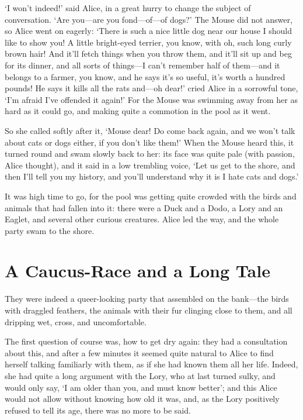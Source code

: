 \documentclass[12pt]{book}
\begin{document}
\begin{Parallel}[p]{}{}
{‘I won’t indeed!’ said Alice, in a great hurry to change the subject of conversation. ‘Are you—are you fond—of—of dogs?’ The Mouse did not answer, so Alice went on eagerly: ‘There is such a nice little dog near our house I should like to show you! A little bright-eyed terrier, you know, with oh, such long curly brown hair! And it’ll fetch things when you throw them, and it’ll sit up and beg for its dinner, and all sorts of things—I can’t remember half of them—and it belongs to a farmer, you know, and he says it’s so useful, it’s worth a hundred pounds! He says it kills all the rats and—oh dear!’ cried Alice in a sorrowful tone, ‘I’m afraid I’ve offended it again!’ For the Mouse was swimming away from her as hard as it could go, and making quite a commotion in the pool as it went.

So she called softly after it, ‘Mouse dear! Do come back again, and we won’t talk about cats or dogs either, if you don’t like them!’ When the Mouse heard this, it turned round and swam slowly back to her: its face was quite pale (with passion, Alice thought), and it said in a low trembling voice, ‘Let us get to the shore, and then I’ll tell you my history, and you’ll understand why it is I hate cats and dogs.’

It was high time to go, for the pool was getting quite crowded with the birds and animals that had fallen into it: there were a Duck and a Dodo, a Lory and an Eaglet, and several other curious creatures. Alice led the way, and the whole party swam to the shore.

\section{A Caucus-Race and a Long Tale}

They were indeed a queer-looking party that assembled on the bank—the birds with draggled feathers, the animals with their fur clinging close to them, and all dripping wet, cross, and uncomfortable.

The first question of course was, how to get dry again: they had a consultation about this, and after a few minutes it seemed quite natural to Alice to find herself talking familiarly with them, as if she had known them all her life. Indeed, she had quite a long argument with the Lory, who at last turned sulky, and would only say, ‘I am older than you, and must know better’; and this Alice would not allow without knowing how old it was, and, as the Lory positively refused to tell its age, there was no more to be said.

}
\end{Parallel}
\end{document}
